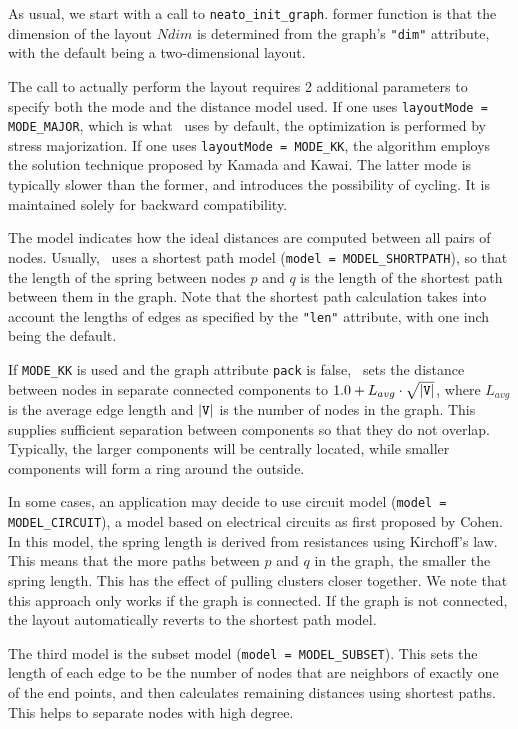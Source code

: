 As usual, we start with a call to {\tt neato\_init\_graph}.
former function is that the dimension of the layout $Ndim$ is determined from
the graph's {\tt "dim"} attribute, with the default being 
a two-dimensional layout. 

The call to actually perform the layout requires 2 additional parameters
to specify both the mode and the distance model used. 
If one uses {\tt layoutMode = MODE\_MAJOR}, which is what \neato\ uses
by default, the optimization is performed by stress majorization\cite{gkn}.
If one uses {\tt layoutMode = MODE\_KK}, the algorithm employs the
solution technique proposed by Kamada and Kawai\cite{kk}.
The latter mode is typically slower than the former, and introduces the
possibility of cycling. It is maintained solely for backward compatibility.

The model indicates how the ideal distances are computed between all
pairs of nodes.  Usually, \neato\
uses a shortest path model ({\tt model = MODEL\_SHORTPATH}),
so that the length of the spring between
nodes $p$ and $q$ is the length of the shortest path between them
in the graph. Note that the shortest path calculation takes
into account the lengths of edges as specified by the {\tt "len"}
attribute, with one inch being the default. 

If {\tt MODE\_KK} is used and the graph attribute {\tt pack} is false, 
\neato\ sets the distance between nodes in separate connected components
to $1.0 + L_{avg}\cdot\sqrt{|{\tt V}|}$, 
where $L_{avg}$ is the average edge length and $|{\tt V}|$
is the number of nodes in the graph.
This supplies sufficient separation between components
so that they do not overlap. Typically, the larger components will be
centrally located, while smaller components will form a ring around
the outside.

In some cases, an application may decide to use circuit model
({\tt model = MODEL\_CIRCUIT}),
a model based on electrical circuits 
as first proposed by Cohen\cite{cohen}. 
In this model, the spring length is derived from resistances using
Kirchoff's law. This means that the more paths between  $p$ and $q$
in the graph, the smaller the spring length. This has the effect of
pulling clusters closer together.
We note that this approach only works if the graph is connected.
If the graph is not connected, the layout automatically reverts to the
shortest path model.

The third model is the subset model ({\tt model = MODEL\_SUBSET}).
This sets the length of each edge to be the number of nodes that are 
neighbors of exactly one of the end points, and then calculates 
remaining distances using shortest paths. This helps to separate 
nodes with high degree. 

